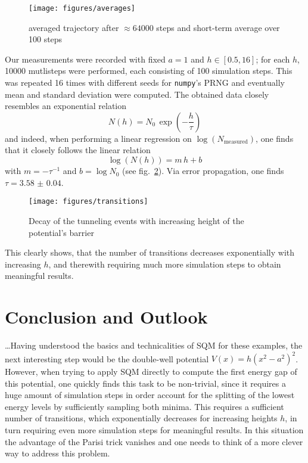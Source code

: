 \documentclass[11pt,a4paper]{scrartcl}
\newcommand*{\figref}[1]{(see fig.~\ref{#1})}
\begin{document}
\begin{figure}[h]
    \centering
    \texttt{[image: figures/averages]}
    \caption{averaged trajectory after $\approx\num{64000}$ steps and
    short-term average over \num{100} steps}
    \label{fig:avg}
\end{figure}

Our measurements were recorded with fixed $a=1$ and $h\in[0.5,16]$; for each
$h$, \num{10000} mutlisteps were performed, each consisting of 100 simulation
steps. This was repeated 16 times with different seeds for \texttt{numpy}'s
PRNG and eventually mean and standard deviation were computed. The obtained
data closely resembles an exponential relation
\begin{equation*}
    N(h)=N_0\,\exp\left(-\frac{h}{\tau}\right)
\end{equation*}
and indeed, when performing a linear regression on
$\log(N_{\mathrm{measured}})$, one finds that it closely follows the linear
relation
\begin{equation*}
    \log\left(N(h)\right)=m\,h+b
\end{equation*}
with $m=-\tau^{-1}$ and $b=\log{N_0}$ \figref{fig:transitions}. Via error
propagation, one finds
$\tau=\num{3.58(4)}$.

\begin{figure}[h]
    \centering
    \texttt{[image: figures/transitions]}
    \caption{Decay of the tunneling events with increasing height of the potential's barrier}
    \label{fig:transitions}
\end{figure}

This clearly shows, that the number of transitions decreases exponentially with
increasing $h$, and therewith requiring much more simulation steps to obtain
meaningful results.


\newpage

\section{Conclusion and Outlook}
\dots Having understood the basics and technicalities of SQM for these
examples, the next interesting step would be the double-well potential
$V(x)=h\left(x^2-a^2\right)^2$.
However, when trying to apply SQM directly to compute the first energy gap of
this potential, one quickly finds this task to be non-trivial, since it
requires a huge amount of simulation steps in order account for the splitting
of the lowest energy levels by sufficiently sampling both minima. This requires
a sufficient number of transitions, which exponentially decreases for
increasing heights $h$, in turn requiring even more simulation steps for
meaningful results. In this situation the advantage of the Parisi trick
vanishes and one needs to think of a more clever way to address this problem.
\end{document}
